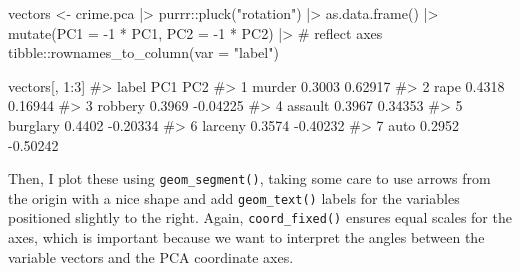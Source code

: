 \documentclass[
  letterpaper,
  10pt,
  krantz2]{krantz}
\makeatletter
\newenvironment{Shaded}{\begin{snugshade}}{\end{snugshade}}
\newcommand{\AttributeTok}[1]{\textcolor[rgb]{0.40,0.45,0.13}{#1}}
\newcommand{\CommentTok}[1]{\textcolor[rgb]{0.37,0.37,0.37}{#1}}
\newcommand{\DecValTok}[1]{\textcolor[rgb]{0.68,0.00,0.00}{#1}}
\newcommand{\FunctionTok}[1]{\textcolor[rgb]{0.28,0.35,0.67}{#1}}
\newcommand{\NormalTok}[1]{\textcolor[rgb]{0.00,0.23,0.31}{#1}}
\newcommand{\OtherTok}[1]{\textcolor[rgb]{0.00,0.23,0.31}{#1}}
\newcommand{\SpecialCharTok}[1]{\textcolor[rgb]{0.37,0.37,0.37}{#1}}
\newcommand{\StringTok}[1]{\textcolor[rgb]{0.13,0.47,0.30}{#1}}
\newenvironment{kframe}{%
  \medskip{}
  \setlength{\fboxsep}{.8em}
  \def\at@end@of@kframe{}%
  \ifinner\ifhmode%
  \def\at@end@of@kframe{\end{minipage}}%
  \begin{minipage}{\columnwidth}%
  \fi\fi%
  \def\FrameCommand##1{\hskip\@totalleftmargin \hskip-\fboxsep
  \colorbox{shadecolor}{##1}\hskip-\fboxsep
      \hskip-\linewidth \hskip-\@totalleftmargin \hskip\columnwidth}%
  \MakeFramed {\advance\hsize-\width
    \@totalleftmargin\z@ \linewidth\hsize
    \@setminipage}}%
{\par\unskip\endMakeFramed%
  \at@end@of@kframe}
\renewenvironment{Shaded}{\begin{kframe}}{\end{kframe}}
\makeatother
\begin{document}
\begin{Shaded}
\begin{Highlighting}[]
\NormalTok{vectors }\OtherTok{\textless{}{-}}\NormalTok{ crime.pca }\SpecialCharTok{|\textgreater{}} 
\NormalTok{  purrr}\SpecialCharTok{::}\FunctionTok{pluck}\NormalTok{(}\StringTok{"rotation"}\NormalTok{) }\SpecialCharTok{|\textgreater{}}
  \FunctionTok{as.data.frame}\NormalTok{() }\SpecialCharTok{|\textgreater{}}
  \FunctionTok{mutate}\NormalTok{(}\AttributeTok{PC1 =} \SpecialCharTok{{-}}\DecValTok{1} \SpecialCharTok{*}\NormalTok{ PC1, }\AttributeTok{PC2 =} \SpecialCharTok{{-}}\DecValTok{1} \SpecialCharTok{*}\NormalTok{ PC2) }\SpecialCharTok{|\textgreater{}}      \CommentTok{\# reflect axes}
\NormalTok{  tibble}\SpecialCharTok{::}\FunctionTok{rownames\_to\_column}\NormalTok{(}\AttributeTok{var =} \StringTok{"label"}\NormalTok{) }

\NormalTok{vectors[, }\DecValTok{1}\SpecialCharTok{:}\DecValTok{3}\NormalTok{]}
\CommentTok{\#\textgreater{}      label    PC1      PC2}
\CommentTok{\#\textgreater{} 1   murder 0.3003  0.62917}
\CommentTok{\#\textgreater{} 2     rape 0.4318  0.16944}
\CommentTok{\#\textgreater{} 3  robbery 0.3969 {-}0.04225}
\CommentTok{\#\textgreater{} 4  assault 0.3967  0.34353}
\CommentTok{\#\textgreater{} 5 burglary 0.4402 {-}0.20334}
\CommentTok{\#\textgreater{} 6  larceny 0.3574 {-}0.40232}
\CommentTok{\#\textgreater{} 7     auto 0.2952 {-}0.50242}
\end{Highlighting}
\end{Shaded}

Then, I plot these using \texttt{geom\_segment()}, taking some care to
use arrows from the origin with a nice shape and add
\texttt{geom\_text()} labels for the variables positioned slightly to
the right. Again, \texttt{coord\_fixed()} ensures equal scales for the
axes, which is important because we want to interpret the angles between
the variable vectors and the PCA coordinate axes.
\end{document}
